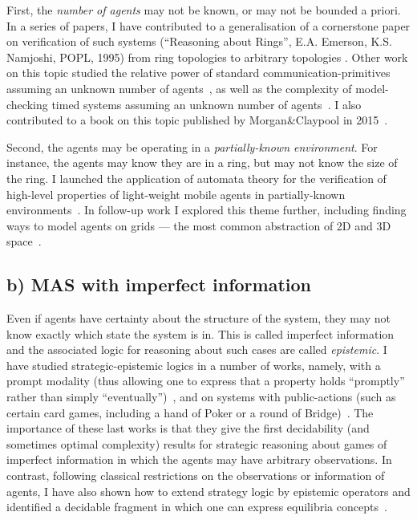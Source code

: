 \documentclass[10pt,a4paper,sans]{moderncv}
\begin{document}
First, the \emph{number of agents} may not be known, or may not be bounded a priori.
In a series of papers, I have contributed to a generalisation of a cornerstone paper on verification of such systems (``Reasoning about Rings'', E.A. Emerson, K.S. Namjoshi, 
\textsc{POPL}, 1995) from ring topologies to arbitrary topologies \cite{DBLP:conf/vmcai/AminofJKR14,DBLP:conf/concur/AminofKRSV14,DBLP:conf/cade/AminofR16,AKRSV17}. Other work on this topic 
studied the relative power of standard communication-primitives assuming an unknown number of agents~\cite{DBLP:conf/lpar/AminofRZ15}, as well as the complexity of model-checking timed systems assuming an unknown number of agents~\cite{DBLP:conf/icalp/AminofRZS15}. I also contributed to a book on this topic published by Morgan\&Claypool in 2015~\cite{DBLP:series/synthesis/2015Bloem,DBLP:journals/sigact/BloemJKKRVW16}.
\newline



Second, the agents may be operating in a \emph{partially-known environment}. For instance, the agents may know they are in a ring, but may not know the size of the ring. I launched the application of automata theory for the verification of high-level properties of light-weight mobile agents in partially-known environments~\cite{DBLP:conf/atal/Rubin15}. In follow-up work I explored this theme further, including finding ways to model agents on grids --- the most common abstraction of 2D and 3D space~\cite{DBLP:conf/prima/RubinZMA15,DBLP:conf/atal/AminofMRZ16,DBLP:conf/prima/MuranoPR15}.
\newline  

\subsection{b) MAS with imperfect information}
Even if agents have certainty about the structure of the system, they may not know exactly which state the system is in. This is called imperfect information and the associated logic for reasoning about such cases are called \emph{epistemic}. I have studied strategic-epistemic logics in a number of works, namely, with a prompt modality (thus allowing one to express that a property holds ``promptly'' rather than simply ``eventually'')~\cite{DBLP:conf/kr/AminofMRZ16}, and on systems with public-actions (such as certain card games, including a hand of Poker or a round of Bridge)~\cite{BLMR17,BLMR17IJCAI}. The importance of these last works is that they give the first decidability (and sometimes optimal complexity) results for strategic reasoning about games of imperfect information in which the agents may have arbitrary observations. In contrast, following classical restrictions on the observations or information of agents, I have also shown how to extend strategy logic by epistemic operators and identified a decidable fragment in which one can express equilibria concepts~\cite{BMMRV17}.
\newline
\end{document}
